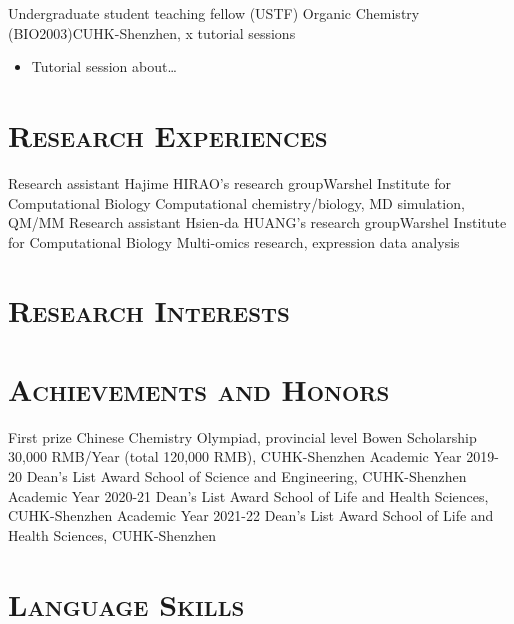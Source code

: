 \documentclass[11pt,a4paper]{moderncv}
\newcommand{\cvsection}[1]{\section{\textsc{#1}}}
\begin{document}
        {Undergraduate student teaching fellow (USTF)}{}
        {Organic Chemistry (BIO2003)}{CUHK-Shenzhen, x tutorial sessions}
        {
                \begin{itemize}
                    \item Tutorial session about\dots
                \end{itemize}
                }


\cvsection{Research Experiences}
        {Research assistant}{}
        {Hajime HIRAO's research group}{Warshel Institute
        for Computational Biology}
        {Computational chemistry/biology, MD simulation, QM/MM}
        {Research assistant}{}
        {Hsien-da HUANG's research group}{Warshel Institute
        for Computational Biology}
        {Multi-omics research, expression data analysis}


\cvsection{Research Interests}

\cvsection{Achievements and Honors}
        {First prize}{}
        {Chinese Chemistry Olympiad, provincial level}{}
        {}
        {Bowen Scholarship}{}
        {30,000 RMB/Year (total 120,000 RMB), CUHK-Shenzhen}{}
        {}
        {Academic Year 2019-20 Dean's List Award}{}
        {School of Science and Engineering, CUHK-Shenzhen}{}
        {}
        {Academic Year 2020-21 Dean's List Award}{}
        {School of Life and Health Sciences, CUHK-Shenzhen}{}
        {}
        {Academic Year 2021-22 Dean's List Award}{}
        {School of Life and Health Sciences, CUHK-Shenzhen}{}
        {}

\cvsection{Language Skills}

\end{document}
